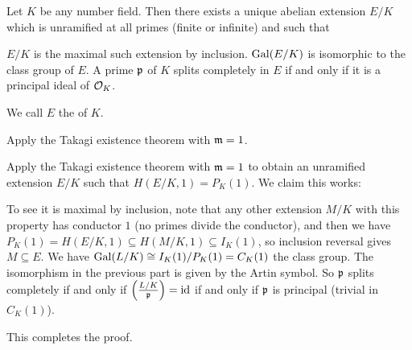 \begin{dproblem}
	Let $K$ be any number field.
	Then there exists a unique abelian extension $E/K$
	which is unramified at all primes (finite or infinite)
	and such that
	\begin{itemize}
		\ii $E/K$ is the maximal such extension by inclusion.
		\ii $\operatorname{Gal}(E/K)$ is isomorphic to the class group of $E$.
		\ii A prime $\mathfrak p$ of $K$ splits completely in $E$
		if and only if it is a principal ideal of $\mathcal O_K$.
	\end{itemize}
	We call $E$ the  of $K$.
	\begin{hint}
		Apply the Takagi existence theorem with $\mathfrak m = 1$.
	\end{hint}
	\begin{sol}
		Apply the Takagi existence theorem with $\mathfrak m = 1$
		to obtain an unramified extension $E/K$ such that
		$H(E/K, 1) = P_K(1)$.
		We claim this works:
		\begin{itemize}
			\ii To see it is maximal by inclusion, note that any other extension $M/K$
			with this property has conductor $1$ (no primes divide the conductor),
			and then we have $P_K(1) = H(E/K, 1) \subseteq H(M/K, 1) \subseteq I_K(1)$,
			so inclusion reversal gives $M \subseteq E$.
			\ii We have $\operatorname{Gal}(L/K) \cong I_K(1) / P_K(1) = C_K(1)$ the class group.
			\ii The isomorphism in the previous part is given by the Artin symbol.
			So $\mathfrak p$ splits completely if and only if $\left( \frac{L/K}{\mathfrak p} \right) = \mathrm{id}$
			if and only if $\mathfrak p$ is principal (trivial in $C_K(1)$).
		\end{itemize}
		This completes the proof.
	\end{sol}
\end{dproblem}

